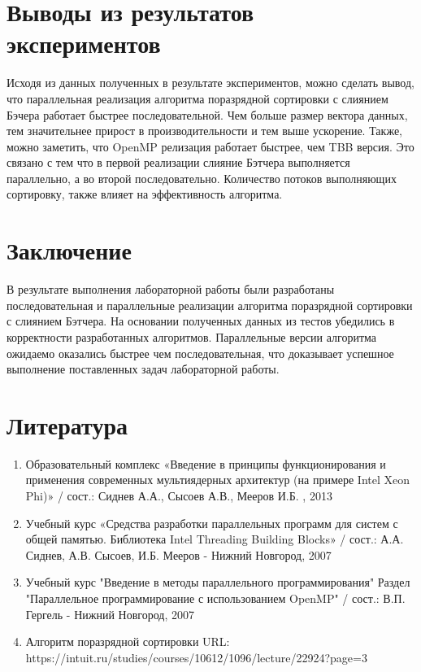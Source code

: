 \documentclass{report}
\begin{document}
\newpage

\section*{Выводы из результатов экспериментов}
Исходя из данных полученных в результате экспериментов, можно сделать вывод, что параллельная реализация алгоритма поразрядной сортировки с слиянием Бэчера работает быстрее последовательной. Чем больше размер вектора данных, тем значительнее прирост в производительности и тем выше ускорение. Также, можно заметить, что OpenMP релизация работает быстрее, чем TBB версия. Это связано с тем что в первой реализации слияние Бэтчера выполняется параллельно, а во второй последовательно. Количество потоков выполняющих сортировку, также влияет на эффективность алгоритма.
\newpage

\section*{Заключение}
В результате выполнения лабораторной работы были  разработаны последовательная и параллельные реализации алгоритма поразрядной сортировки с слиянием Бэтчера. На основании полученных данных из тестов убедились в корректности разработанных алгоритмов. Параллельные версии алгоритма ожидаемо оказались быстрее чем последовательная, что доказывает успешное выполнение поставленных задач лабораторной работы.
\newpage

\section*{Литература}
\begin{enumerate}
\item Образовательный комплекс «Введение в принципы функционирования и применения современных мультиядерных архитектур (на примере Intel Xeon Phi)» / сост.: Сиднев А.А., Сысоев А.В., Мееров И.Б. , 2013
\item Учебный курс «Средства разработки параллельных программ для систем с общей памятью. Библиотека Intel Threading Building Blocks»  / сост.: А.А. Сиднев, А.В. Сысоев, И.Б. Мееров - Нижний Новгород, 2007 
\item Учебный курс "Введение в методы параллельного программирования" Раздел "Параллельное программирование с использованием OpenMP"  / сост.: В.П. Гергель - Нижний Новгород, 2007 
\item Алгоритм поразрядной сортировки \newline URL: https://intuit.ru/studies/courses/10612/1096/lecture/22924?page=3
\end{enumerate} 
\newpage
\end{document}

